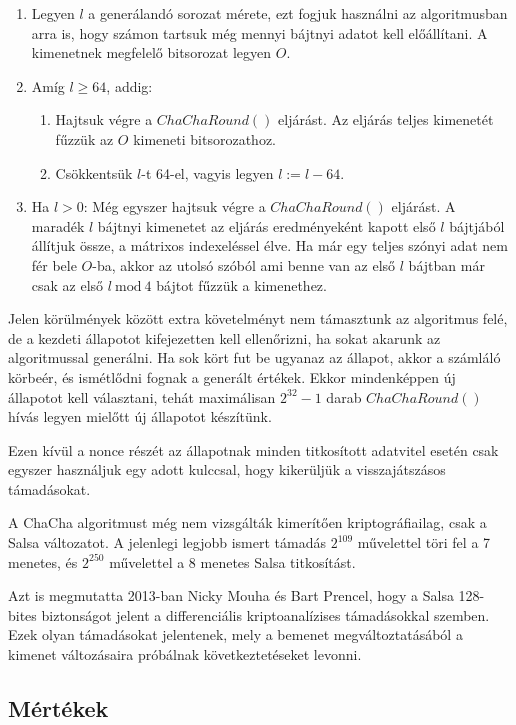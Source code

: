 \documentclass[12pt]{article}
\begin{document}
	\begin{enumerate}
		\item Legyen $l$ a generálandó sorozat mérete, ezt fogjuk használni az algoritmusban arra is, hogy számon tartsuk még mennyi bájtnyi adatot kell előállítani. A kimenetnek megfelelő bitsorozat legyen $O$.
		\item Amíg $l \geq 64$, addig:
		\begin{enumerate}
			\item Hajtsuk végre a $ChaChaRound()$ eljárást. Az eljárás teljes kimenetét fűzzük az $O$ kimeneti bitsorozathoz.
			\item Csökkentsük $l$-t 64-el, vagyis legyen $l := l - 64$.
		\end{enumerate}
		\item Ha $l > 0$: Még egyszer hajtsuk végre a $ChaChaRound()$ eljárást. A maradék $l$ bájtnyi kimenetet az eljárás eredményeként kapott első $l$ bájtjából állítjuk össze, a mátrixos indexeléssel élve. Ha már egy teljes szónyi adat nem fér bele $O$-ba, akkor az utolsó szóból ami benne van az első $l$ bájtban már csak az első $l \ \textrm{mod} \ 4$ bájtot fűzzük a kimenethez.
	\end{enumerate} 
	Jelen körülmények között extra követelményt nem támasztunk az algoritmus felé, de a kezdeti állapotot kifejezetten kell ellenőrizni, ha sokat akarunk az algoritmussal generálni. Ha sok kört fut be ugyanaz az állapot, akkor a számláló körbeér, és ismétlődni fognak a generált értékek. Ekkor mindenképpen új állapotot kell választani, tehát maximálisan $2^{32}-1$ darab $ChaChaRound()$ hívás legyen mielőtt új állapotot készítünk.
	
	Ezen kívül a nonce részét az állapotnak minden titkosított adatvitel esetén csak egyszer használjuk egy adott kulccsal, hogy kikerüljük a visszajátszásos támadásokat.
	
	A ChaCha algoritmust még nem vizsgálták kimerítően kriptográfiailag, csak a Salsa változatot. A jelenlegi legjobb ismert támadás $2^{109}$ művelettel töri fel a 7 menetes, és $2^{250}$ művelettel a 8 menetes Salsa titkosítást. \cite{salsaattack}
	
	Azt is megmutatta 2013-ban Nicky Mouha és Bart Prencel, hogy a Salsa 128-bites biztonságot jelent a differenciális kriptoanalízises támadásokkal szemben. \cite{salsadiffcrypt} Ezek olyan támadásokat jelentenek, mely a bemenet megváltoztatásából a kimenet változásaira próbálnak következtetéseket levonni.
	\subsection{Mértékek}
\end{document}
